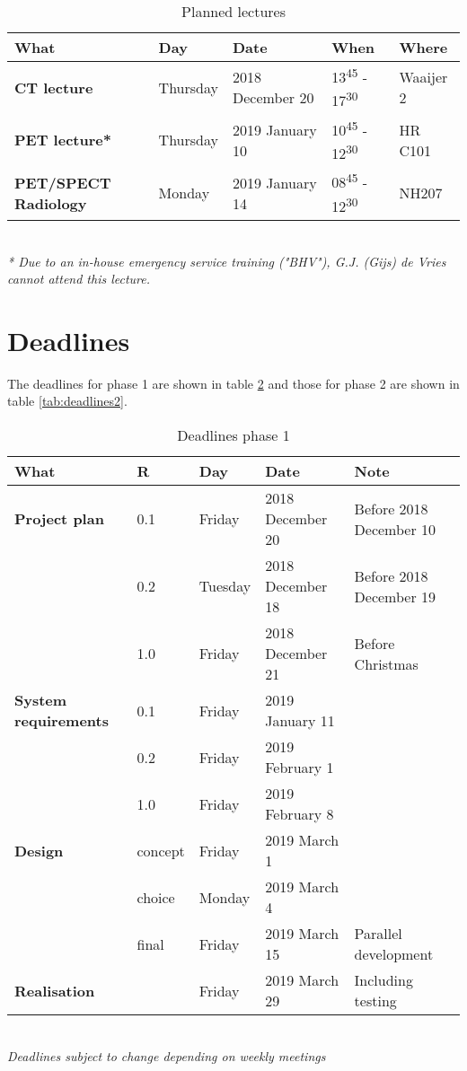\begin{table} [h!]
	\begin{tabular}{l|llll}
		\textbf{What} 		&	Day 		&	Date				&	When & Where\\
		\hline
		\textbf{CT lecture}	&	Thursday	&	2018 December 20	& 13\textsuperscript{45} - 17\textsuperscript{30} & Waaijer 2\\
		\rowcolor{Gray}
		\textbf{PET lecture*}&	Thursday	& 	2019 January 10 	& 10\textsuperscript{45} - 12\textsuperscript{30} & HR C101 \\
		\textbf{PET/SPECT Radiology}& 	Monday 	&	2019 January 14	& 08\textsuperscript{45} - 12\textsuperscript{30} & NH207\\
		\hline
	\end{tabular} \\
	\textit{* Due to an in-house emergency service training ("BHV"), G.J. (Gijs) de Vries cannot attend this lecture.} \raggedright
	\caption{Planned lectures}
	\label{tab:lectures}
\end{table}

\newpage
\section{Deadlines}
The deadlines for phase 1 are shown in table \ref{tab:deadlines} and those for phase 2 are shown in table \ref{tab:deadlines2}.

\begin{table}[h!]
	\hspace{-1cm}\begin{tabular}{l|llll}
		\textbf{What} 		&	R	& 	Day	&	Date	&	Note \\
		\hline
		\textbf{Project plan}& 0.1	& Friday 		& 2018 December 20	&	Before 2018 December 10 \\
		\rowcolor{Gray}
		 	&	0.2 	&	 Tuesday & 2018 December 18 & Before 2018 December 19\\
		 	&	1.0		&	Friday	&  2018 December 21 & Before Christmas\\
		 	\hline
		 	\rowcolor{Gray}
		\textbf{System requirements} & 0.1 & Friday & 2019 January 11 & \\
		& 0.2 & Friday & 2019 February 1 & \\
		\rowcolor{Gray}
			&	1.0		& Friday &	2019 February 8 &\\
		\hline
		\textbf{Design} & concept &Friday & 2019 March 1 & \\
		\rowcolor{Gray}
		 & choice & Monday & 2019 March 4 &  \\
		 & final  & Friday & 2019 March 15 & Parallel development \\
		 \hline
		 \rowcolor{Gray}
		 \textbf{Realisation} & & Friday & 2019 March 29 & Including testing\\
		 \hline
	\end{tabular}\hspace{-1cm}\\
	\textit{Deadlines subject to change depending on weekly meetings}
	\caption{Deadlines phase 1}
	\label{tab:deadlines}
\end{table}

